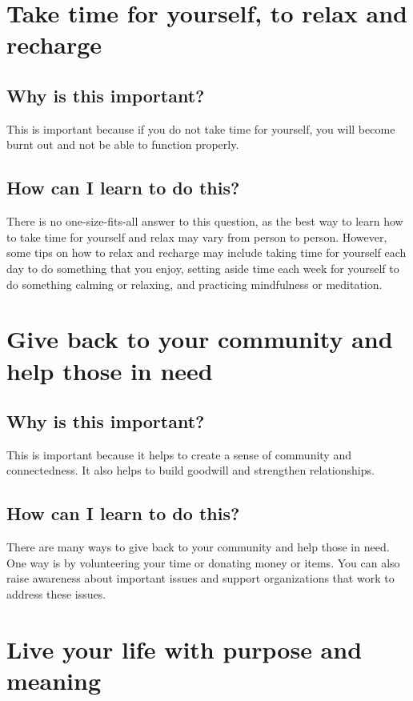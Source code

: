 \documentclass[11pt]{article}
\begin{document}
\section{Take time for yourself, to relax and recharge}
\label{sec:org07ba1dc}
\subsection{Why is this important?}
\label{sec:org37a0e5a}
This is important because if you do not take time for yourself, you will become burnt out and not be able to function properly.

\subsection{How can I learn to do this?}
\label{sec:org8333d7b}
There is no one-size-fits-all answer to this question, as the best way to learn how to take time for yourself and relax may vary from person to person. However, some tips on how to relax and recharge may include taking time for yourself each day to do something that you enjoy, setting aside time each week for yourself to do something calming or relaxing, and practicing mindfulness or meditation.

\section{Give back to your community and help those in need}
\label{sec:org00c0fc0}
\subsection{Why is this important?}
\label{sec:org8faf28c}
This is important because it helps to create a sense of community and connectedness. It also helps to build goodwill and strengthen relationships.

\subsection{How can I learn to do this?}
\label{sec:orgc493951}
There are many ways to give back to your community and help those in need. One way is by volunteering your time or donating money or items. You can also raise awareness about important issues and support organizations that work to address these issues.

\section{Live your life with purpose and meaning}
\label{sec:org5ba887e}
\end{document}
